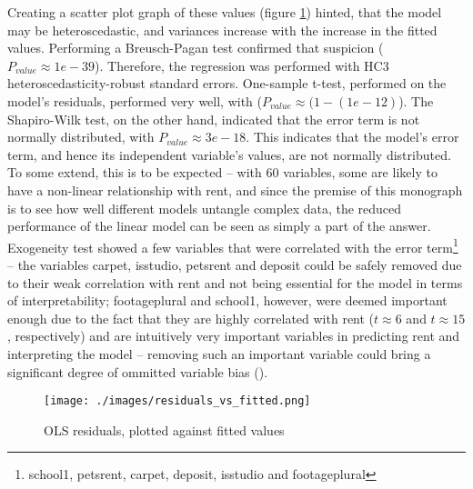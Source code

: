 \documentclass[12pt]{report}
\begin{document}
Creating a scatter plot graph of these values (figure \ref{fig:heteroscedasticity}) hinted, that the model may be heteroscedastic, and variances increase with the increase in the fitted values. Performing a Breusch-Pagan test confirmed that suspicion ($P_{value}\approx1e-39$). Therefore, the regression was performed with HC3 heteroscedasticity-robust standard errors. One-sample t-test, performed on the model's residuals, performed very well, with ($P_{value}\approx(1-(1e-12)$). The Shapiro-Wilk test, on the other hand, indicated that the error term is not normally distributed, with $P_{value}\approx3e-18$. This indicates that the model's error term, and hence its independent variable's values, are not normally distributed. To some extend, this is to be expected -- with 60 variables, some are likely to have a non-linear relationship with rent, and since the premise of this monograph is to see how well different models untangle complex data, the reduced performance of the linear model can be seen as simply a part of the answer. Exogeneity test showed a few variables that were correlated with the error term\footnote{school1, pets\textunderscore rent, carpet, deposit,  is\textunderscore studio and footageplural} -- the variables carpet, is\textunderscore studio, pets\textunderscore rent and deposit could be safely removed due to their weak correlation with rent and not being essential for the model in terms of interpretability; footageplural and school1, however, were deemed important enough due to the fact that they are highly correlated with rent ($t\approx6$ and $t\approx15$, respectively) and are intuitively very important variables in predicting rent and interpreting the model -- removing such an important variable could bring a significant degree of ommitted variable bias (\cite{walsch2021}).

\begin{figure}[h]
	\centering
	\texttt{[image: ./images/residuals\_vs\_fitted.png]}
	\caption{OLS residuals, plotted against fitted values}
	\label{fig:heteroscedasticity}
\end{figure}
\end{document}
